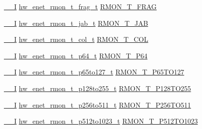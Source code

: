 \begin{DoxyCompactItemize}
\item 
\hyperlink{core__sc300_8h_af63697ed9952cc71e1225efe205f6cd3}{\+\_\+\+\_\+I} \hyperlink{union__hw__enet__rmon__t__frag}{hw\+\_\+enet\+\_\+rmon\+\_\+t\+\_\+frag\+\_\+t} \hyperlink{struct__hw__enet_aa5588448acf96bd6b498681cd240f808}{R\+M\+O\+N\+\_\+\+T\+\_\+\+F\+R\+AG}
\item 
\hyperlink{core__sc300_8h_af63697ed9952cc71e1225efe205f6cd3}{\+\_\+\+\_\+I} \hyperlink{union__hw__enet__rmon__t__jab}{hw\+\_\+enet\+\_\+rmon\+\_\+t\+\_\+jab\+\_\+t} \hyperlink{struct__hw__enet_a289f37cb6e50cd179e2b2400a8c434dc}{R\+M\+O\+N\+\_\+\+T\+\_\+\+J\+AB}
\item 
\hyperlink{core__sc300_8h_af63697ed9952cc71e1225efe205f6cd3}{\+\_\+\+\_\+I} \hyperlink{union__hw__enet__rmon__t__col}{hw\+\_\+enet\+\_\+rmon\+\_\+t\+\_\+col\+\_\+t} \hyperlink{struct__hw__enet_acd048545970591f69a1ee092549e274b}{R\+M\+O\+N\+\_\+\+T\+\_\+\+C\+OL}
\item 
\hyperlink{core__sc300_8h_af63697ed9952cc71e1225efe205f6cd3}{\+\_\+\+\_\+I} \hyperlink{union__hw__enet__rmon__t__p64}{hw\+\_\+enet\+\_\+rmon\+\_\+t\+\_\+p64\+\_\+t} \hyperlink{struct__hw__enet_a78bc03d1e1f18c7397782f9684c3d837}{R\+M\+O\+N\+\_\+\+T\+\_\+\+P64}
\item 
\hyperlink{core__sc300_8h_af63697ed9952cc71e1225efe205f6cd3}{\+\_\+\+\_\+I} \hyperlink{union__hw__enet__rmon__t__p65to127}{hw\+\_\+enet\+\_\+rmon\+\_\+t\+\_\+p65to127\+\_\+t} \hyperlink{struct__hw__enet_a3a9fde1c4521e3fb6bcd76623d38ac3c}{R\+M\+O\+N\+\_\+\+T\+\_\+\+P65\+T\+O127}
\item 
\hyperlink{core__sc300_8h_af63697ed9952cc71e1225efe205f6cd3}{\+\_\+\+\_\+I} \hyperlink{union__hw__enet__rmon__t__p128to255}{hw\+\_\+enet\+\_\+rmon\+\_\+t\+\_\+p128to255\+\_\+t} \hyperlink{struct__hw__enet_a3a3eb7c5d85feda435c205d805cb1599}{R\+M\+O\+N\+\_\+\+T\+\_\+\+P128\+T\+O255}
\item 
\hyperlink{core__sc300_8h_af63697ed9952cc71e1225efe205f6cd3}{\+\_\+\+\_\+I} \hyperlink{union__hw__enet__rmon__t__p256to511}{hw\+\_\+enet\+\_\+rmon\+\_\+t\+\_\+p256to511\+\_\+t} \hyperlink{struct__hw__enet_a9d0e06248657c94cbb97aa71a0e9e897}{R\+M\+O\+N\+\_\+\+T\+\_\+\+P256\+T\+O511}
\item 
\hyperlink{core__sc300_8h_af63697ed9952cc71e1225efe205f6cd3}{\+\_\+\+\_\+I} \hyperlink{union__hw__enet__rmon__t__p512to1023}{hw\+\_\+enet\+\_\+rmon\+\_\+t\+\_\+p512to1023\+\_\+t} \hyperlink{struct__hw__enet_acce741bbd14aff608e0c0103485d0b89}{R\+M\+O\+N\+\_\+\+T\+\_\+\+P512\+T\+O1023}
\item 

\end{DoxyCompactItemize}
